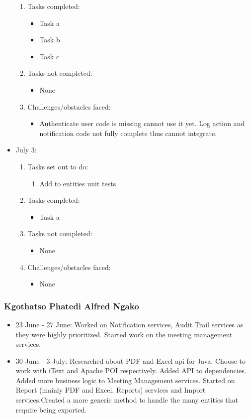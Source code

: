 \begin{itemize}
\begin{enumerate}
		\item Tasks completed:
		\begin{itemize}
			\item Task a
			\item Task b
			\item Task c								
		\end{itemize}
		\item Tasks not completed:
		\begin{itemize}
			\item None
		\end{itemize}
		\item Challenges/obstacles faced:
		\begin{itemize}
			\item Authenticate user code is missing cannot use it yet. Log action and notification code not fully complete thus cannot integrate.
		\end{itemize}			
	\end{enumerate}
	\item July 3:
	\begin{enumerate}
		\item Tasks set out to do:
		\begin{enumerate}
			\item Add to entities unit tests			
		\end{enumerate}
		\item Tasks completed:
		\begin{itemize}
			\item Task a								
		\end{itemize}
		\item Tasks not completed:
		\begin{itemize}
			\item None
		\end{itemize}
		\item Challenges/obstacles faced:
		\begin{itemize}
			\item None
		\end{itemize}			
	\end{enumerate}
\end{itemize}

\subsubsection{Kgothatso Phatedi Alfred Ngako}
\begin{itemize}
	\item 23 June - 27 June: Worked on Notification services, Audit Trail services as they were highly prioritized. Started work on the meeting management services.
	\item 30 June - 3 July: Researched about PDF and Excel api for Java. Choose to work with iText and Apache POI respectively. Added API to dependencies. Added more business logic to Meeting Management services. Started on Report (mainly PDF and Excel. Reports) services and Import services.Created a more generic method to handle the many entities that require being exported.	
\end{itemize}
